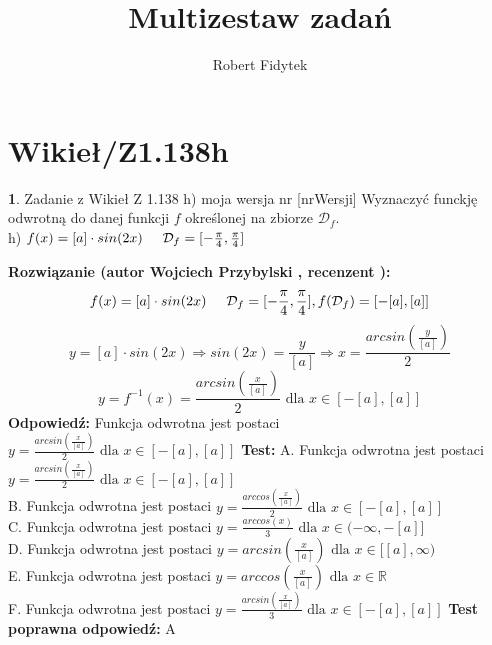 \documentclass[12pt, a4paper]{article}
\title{Multizestaw zadań}
\author{Robert Fidytek}
\date{}
\theoremstyle{definition} %
\newtheorem{zad}{}
\newcommand{\kategoria}[1]{\section{#1}} %
\newcommand{\zadStart}[1]{\begin{zad}#1\newline} %
\newcommand{\zadStop}{\end{zad}}   %
\newcommand{\rozwStart}[2]{\noindent \textbf{Rozwiązanie (autor #1 , recenzent #2): }\newline} %
\newcommand{\rozwStop}{\newline}                                            %
\newcommand{\odpStart}{\noindent \textbf{Odpowiedź:}\newline}    %
\newcommand{\odpStop}{\newline}                                             %
\newcommand{\testStart}{\noindent \textbf{Test:}\newline} %
\newcommand{\testStop}{\newline} %
\newcommand{\kluczStart}{\noindent \textbf{Test poprawna odpowiedź:}\newline} %
\newcommand{\kluczStop}{\newline} %
\begin{document}
\maketitle


\kategoria{Wikieł/Z1.138h}
\zadStart{Zadanie z Wikieł Z 1.138 h) moja wersja nr [nrWersji]}
Wyznaczyć funckję odwrotną do danej funkcji $f$ określonej na zbiorze $\mathcal{D}_{f}$.\\
h) $f(x)=[a]\cdot sin(2x)\hspace{5mm}\mathcal{D}_{f}=[-\frac{\pi}{4},\frac{\pi}{4}]$
\zadStop
\rozwStart{Wojciech Przybylski}{}
$$f(x)=[a]\cdot sin(2x)\hspace{5mm} \mathcal{D}_{f}=[-\frac{\pi}{4},\frac{\pi}{4}], f(\mathcal{D}_{f})=[-[a],[a]]$$
$$y=[a]\cdot sin(2x)\Rightarrow sin(2x)=\frac{y}{[a]} \Rightarrow x=\frac{arcsin(\frac{y}{[a]})}{2}$$
$$y=f^{-1}(x)=\frac{arcsin(\frac{x}{[a]})}{2} \mbox{ dla } x\in [-[a],[a]]$$
\rozwStop
\odpStart
Funkcja odwrotna jest postaci $y=\frac{arcsin(\frac{x}{[a]})}{2}  \mbox{ dla }x\in[-[a],[a]]$
\odpStop
\testStart
A. Funkcja odwrotna jest postaci $y=\frac{arcsin(\frac{x}{[a]})}{2}   \mbox{ dla }x\in[-[a],[a]]$\\
B. Funkcja odwrotna jest postaci $y=\frac{arccos(\frac{x}{[a]})}{2}  \mbox{ dla }x\in[-[a],[a]]$\\
C. Funkcja odwrotna jest postaci $y=\frac{arccos(x)}{3} \mbox{ dla }x\in(-\infty,-[a]]$\\
D. Funkcja odwrotna jest postaci $y=arcsin(\frac{x}{[a]})  \mbox{ dla }x\in[[a],\infty)$\\
E. Funkcja odwrotna jest postaci $y=arccos(\frac{x}{[a]}) \mbox{ dla }x\in \mathbb{R}$\\
F. Funkcja odwrotna jest postaci $y=\frac{arcsin(\frac{x}{[a]})}{3} \mbox{ dla }x\in[-[a],[a]]$
\testStop
\kluczStart
A
\kluczStop
\end{document}
